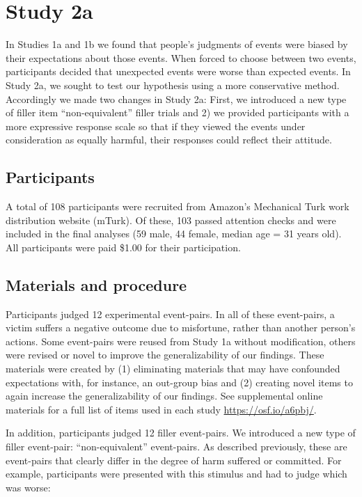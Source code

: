 \documentclass[10pt, letterpaper]{article}
\begin{document}
\section{Study 2a}\label{study-2a}

In Studies 1a and 1b we found that people's judgments of events were
biased by their expectations about those events. When forced to choose
between two events, participants decided that unexpected events were
worse than expected events. In Study 2a, we sought to test our
hypothesis using a more conservative method. Accordingly we made two
changes in Study 2a: First, we introduced a new type of filler item
``non-equivalent'' filler trials and 2) we provided participants with a
more expressive response scale so that if they viewed the events under
consideration as equally harmful, their responses could reflect their
attitude.

\subsection{Participants}\label{participants-2}

A total of 108 participants were recruited from Amazon's Mechanical Turk
work distribution website (mTurk). Of these, 103 passed attention checks
and were included in the final analyses (59 male, 44 female, median age
= 31 years old). All participants were paid \$1.00 for their
participation.

\subsection{Materials and procedure}\label{materials-and-procedure-2}

Participants judged 12 experimental event-pairs. In all of these
event-pairs, a victim suffers a negative outcome due to misfortune,
rather than another person's actions. Some event-pairs were reused from
Study 1a without modification, others were revised or novel to improve
the generalizability of our findings. These materials were created by
(1) eliminating materials that may have confounded expectations with,
for instance, an out-group bias and (2) creating novel items to again
increase the generalizability of our findings. See supplemental online
materials for a full list of items used in each study
\url{https://osf.io/a6pbj/}.

In addition, participants judged 12 filler event-pairs. We introduced a
new type of filler event-pair: ``non-equivalent'' event-pairs. As
described previously, these are event-pairs that clearly differ in the
degree of harm suffered or committed. For example, participants were
presented with this stimulus and had to judge which was worse:
\end{document}
